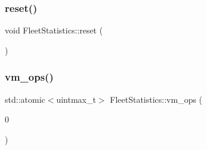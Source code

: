 \subsubsection{\texorpdfstring{reset()}{reset()}}
{\footnotesize\ttfamily void Fleet\+Statistics\+::reset (\begin{DoxyParamCaption}{ }\end{DoxyParamCaption})}

\mbox{\label{namespace_fleet_statistics_ad64460a8eef2b5d661f5cf19a02e9480}} 
\subsubsection{\texorpdfstring{vm\+\_\+ops()}{vm\_ops()}}
{\footnotesize\ttfamily std\+::atomic$<$uintmax\+\_\+t$>$ Fleet\+Statistics\+::vm\+\_\+ops (\begin{DoxyParamCaption}\item[{0}]{ }\end{DoxyParamCaption})}

